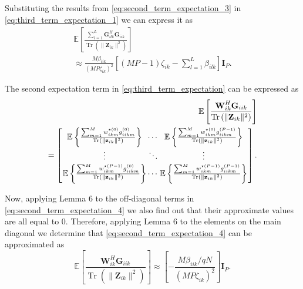 \documentclass[journal,12pt,onecolumn]{IEEEtran}
\DeclareMathOperator{\Tr}{Tr}
\begin{document}
Substituting the results from \eqref{eq:second_term_expectation_3} in \eqref{eq:third_term_expectation_1} we can express it as
\begin{equation}\label{eq:second_term_expectation_6}
\begin{split}
\mathbb{E} \left[ \frac{\sum_{l=1}^{L} \textbf{G}_{ilk}^{H} \textbf{G}_{iik}}{\Tr \left( \lVert \textbf{Z}_{ik} \rVert^{2} \right)} \right] \\ \approx \frac{M \beta_{iik}}{(MP \zeta_{ik})^{2}} \left[ (MP-1) \zeta_{ik} - \sum_{l=1}^{L}{\beta_{ilk}} \right] \textbf{I}_{P}.
\end{split}
\end{equation}

The second expectation term in \eqref{eq:third_term_expectation} can be expressed as
\begin{equation}\label{eq:second_term_expectation_4}
\begin{split}
\mathbb{E} \left[ \frac{\textbf{W}_{ik}^{H} \textbf{G}_{iik}}{\Tr \left( \lVert \textbf{Z}_{ik} \rVert^{2} \right)} \right] \\ = \arraycolsep=0.8pt\def\arraystretch{1.5}
\left[\begin{array}{ccc} \mathbb{E} \left\lbrace \frac{\sum_{m=1}^{M} w_{ikm}^{\star (0)} g_{iikm}^{(0)} }{\Tr \left( \lVert \textbf{z}_{ik} \rVert^{2} \right)} \right\rbrace & \cdots & \mathbb{E} \left\lbrace \frac{\sum_{m=1}^{M} w_{ikm}^{\star (0)}g_{iikm}^{(P-1)} }{\Tr \left( \lVert \textbf{z}_{ik} \rVert^{2} \right)} \right\rbrace \\
\vdots & \ddots & \vdots \\
\mathbb{E} \left\lbrace \frac{\sum_{m=1}^{M} w_{ikm}^{\star(P-1)}g_{iikm}^{(0)} }{\Tr \left( \lVert \textbf{z}_{ik} \rVert^{2} \right)}\right\rbrace & \cdots & \mathbb{E} \left\lbrace \frac{\sum_{m=1}^{M} w_{ikm}^{\star (P-1)}g_{iikm}^{(P-1)} }{\Tr \left( \lVert \textbf{z}_{ik} \rVert^{2} \right)} \right\rbrace
\end{array} \right].
\end{split}
\end{equation}

Now, applying Lemma 6 to the off-diagonal terms in \eqref{eq:second_term_expectation_4} we also find out that their approximate values are all equal to 0. Therefore, applying Lemma 6 to the elements on the main diagonal we determine that \eqref{eq:second_term_expectation_4} can be approximated as
\begin{equation}\label{eq:second_term_expectation_5}
\mathbb{E} \left[ \frac{\textbf{W}_{ik}^{H} \textbf{G}_{iik}}{\Tr \left( \lVert \textbf{Z}_{ik} \rVert^{2} \right)} \right] \approx \left[ -\frac{M \beta_{iik} / qN}{(MP \zeta_{ik})^{2}} \right] \textbf{I}_{P}.
\end{equation}
\end{document}
